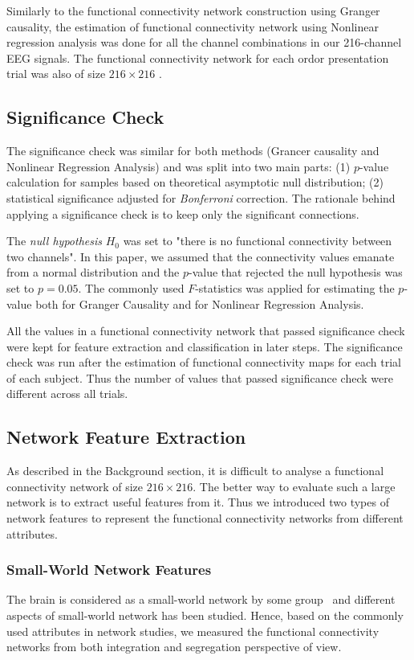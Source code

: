 Similarly to the functional connectivity network construction using Granger causality, the estimation of functional connectivity network using Nonlinear regression analysis was done for all the channel combinations in our 216-channel EEG signals. The functional connectivity network for each ordor presentation trial was also of size $216 \times 216$ .

\subsection{Significance Check}
The significance check was similar for both methods (Grancer causality and Nonlinear Regression Analysis) and was split into two main parts: (1) $p$-value calculation for samples based on theoretical asymptotic null distribution; (2) statistical significance adjusted for \emph{Bonferroni} correction. The rationale behind applying a significance check is to keep only the significant connections. 

The \emph{null hypothesis} $H_0$ was set to "there is no functional connectivity between two channels". In this paper, we assumed that the connectivity values emanate from a normal distribution and the $p$-value that rejected the null hypothesis was set to $p=0.05$. The commonly used $F$-statistics was applied for estimating the $p$-value both for Granger Causality and for Nonlinear Regression Analysis.

All the values in a functional connectivity network that passed significance check were kept for feature extraction and classification in later steps. The significance check was run after the estimation of functional connectivity maps for each trial of each subject. Thus the number of values that passed significance check were different across all trials. 


\subsection{Network Feature Extraction}
As described in the Background section, it is difficult to analyse a functional connectivity network of size $216 \times 216$. The better way to evaluate such a large network is to extract useful features from it. Thus we introduced two types of network features to represent the functional connectivity networks from different attributes. 

\subsubsection{Small-World Network Features}
The brain is considered as a small-world network by some group~\cite{bassett2006small} and different aspects of small-world network has been studied. Hence, based on the commonly used attributes in network studies, we measured the functional connectivity networks from both integration and segregation perspective of view. 


